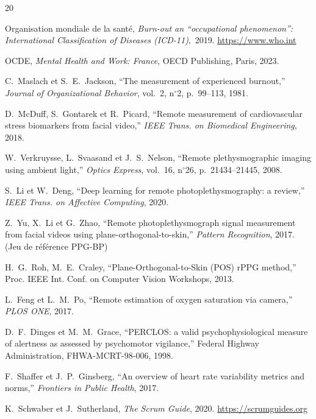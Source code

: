 \documentclass[11pt,a4paper]{article}
\begin{document}
\newpage
\begin{thebibliography}{20}
\small

 Organisation mondiale de la santé, \textit{Burn-out an ``occupational phenomenon'':
International Classification of Diseases (ICD-11)}$, $ 2019. \url{https://www.who.int}

 OCDE, \textit{Mental Health and Work: France}, OECD Publishing, Paris, 2023.

 C.~Maslach et S.~E.~Jackson, ``The measurement of experienced burnout,''
\textit{Journal of Organizational Behavior}, vol.~2, n$^{\circ}$2, p.~99--113, 1981.

 D.~McDuff, S.~Gontarek et R.~Picard, ``Remote measurement of cardiovascular
stress biomarkers from facial video,'' \textit{IEEE Trans. on Biomedical Engineering}, 2018.

 W.~Verkruysse, L.~Svaasand et J.~S.~Nelson, ``Remote plethysmographic
imaging using ambient light,'' \textit{Optics Express}, vol.~16, n$^{\circ}$26, p.~21434--21445, 2008.

 S.~Li et W.~Deng, ``Deep learning for remote photoplethysmography: a review,''
\textit{IEEE Trans. on Affective Computing}, 2020.

 Z.~Yu, X.~Li et G.~Zhao, ``Remote photoplethysmograph signal measurement from
facial videos using plane-orthogonal-to-skin,'' \textit{Pattern Recognition}, 2017. (Jeu de référence
PPG-BP)

 H.~G.~Roh, M.~E.~Craley, ``Plane-Orthogonal-to-Skin (POS) rPPG method,''
Proc. IEEE Int. Conf. on Computer Vision Workshops, 2013.

 L.~Feng et L.~M.~Po, ``Remote estimation of oxygen saturation via camera,''
\textit{PLOS ONE}, 2017.

 D.~F.~Dinges et M.~M.~Grace, ``PERCLOS: a valid psychophysiological measure of
alertness as assessed by psychomotor vigilance,'' Federal Highway Administration, FHWA-MCRT-98-006, 1998.

 F.~Shaffer et J.~P.~Ginsberg, ``An overview of heart rate variability metrics and
norms,'' \textit{Frontiers in Public Health}, 2017.

 K.~Schwaber et J.~Sutherland, \textit{The Scrum Guide}, 2020.
\url{https://scrumguides.org}


\end{thebibliography}
\end{document}
